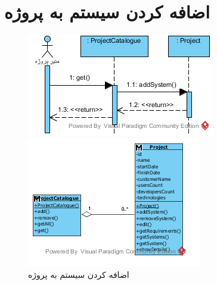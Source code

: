 \section{اضافه کردن سیستم به پروژه}
\begin{figure}[H]
	\centering
	\includegraphics[scale=1]{img/sequence-analysis/AddSystemToProject}
	
	
	\includegraphics[scale=1]{img/sequence-analysis/AddSystemToProjectC}
	\caption{اضافه کردن سیستم به پروژه}
\end{figure}

